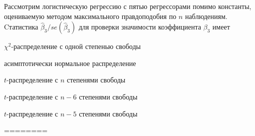 
\begin{question}
Рассмотрим логистическую регрессию с пятью регрессорами помимо
константы, оцениваемую методом максимального правдоподобия по \(n\)
наблюдениям. Cтатистика \(\hat \beta_3 / se(\hat\beta_3)\) для проверки
значимости коэффициента \(\beta_3\) имеет
\begin{answerlist}
  \item \(\chi^2\)-распределение с одной степенью свободы
  \item асимптотически нормальное распределение
  \item \(t\)-распределение с \(n\) степенями свободы
  \item \(t\)-распределение с \(n-6\) степенями свободы
  \item \(t\)-распределение с \(n-5\) степенями свободы
\end{answerlist}
\end{question}

\begin{solution}
========
\end{solution}

